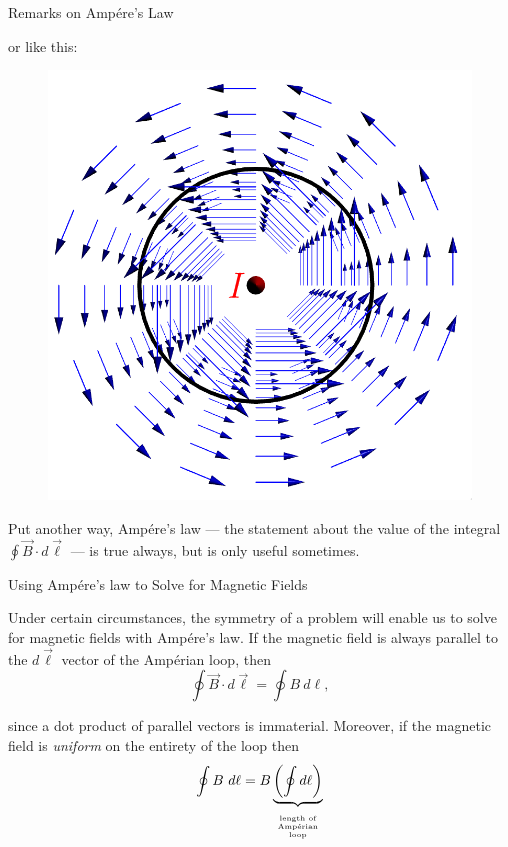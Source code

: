 \documentclass{beamer}
\begin{document}
\begin{frame}{Remarks on Amp{\'e}re's Law}

or like this:

\begin{figure}[H]
\centering
\includegraphics[height=0.6\textheight]{figures/infwire_loop2.png}
\end{figure}

Put another way, Amp{\'e}re's law --- the statement about the value of the integral $\displaystyle \oint \vec{B} \cdot d\vec{\ell}$ --- is true always, but is only useful sometimes.

\end{frame}

\begin{frame}{Using Amp{\'e}re's law to Solve for Magnetic Fields}

Under certain circumstances, the symmetry of a problem will enable us to solve for magnetic fields with Amp{\'e}re's law. If the magnetic field is always parallel to the $d\vec{\ell}$ vector of the Amp{\'e}rian loop, then
\begin{equation*}
    \oint \vec{B} \cdot d\vec{\ell} = \oint B\ d\ell,
\end{equation*}

since a dot product of parallel vectors is immaterial. Moreover, if the magnetic field is \emph{uniform} on the entirety of the loop then
\begin{equation*}
    \oint B\ d\ell = B \underbrace{\left( \oint d\ell \right)}_{\parbox[c]{3em}{\vspace{-0.5em}\begin{center} \tiny length of Amp{\'e}rian loop \end{center}}}
\end{equation*}

\end{frame}
\end{document}
